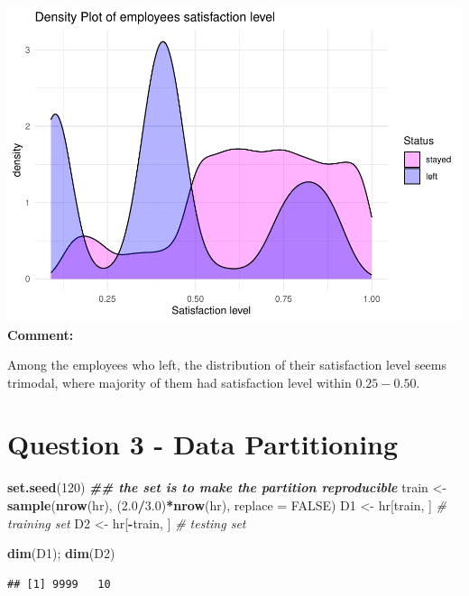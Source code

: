 \documentclass[
  11pt,
]{article}
\newenvironment{Shaded}{\begin{snugshade}}{\end{snugshade}}
\newcommand{\AttributeTok}[1]{\textcolor[rgb]{0.13,0.29,0.53}{#1}}
\newcommand{\CommentTok}[1]{\textcolor[rgb]{0.56,0.35,0.01}{\textit{#1}}}
\newcommand{\ConstantTok}[1]{\textcolor[rgb]{0.56,0.35,0.01}{#1}}
\newcommand{\DecValTok}[1]{\textcolor[rgb]{0.00,0.00,0.81}{#1}}
\newcommand{\DocumentationTok}[1]{\textcolor[rgb]{0.56,0.35,0.01}{\textbf{\textit{#1}}}}
\newcommand{\FloatTok}[1]{\textcolor[rgb]{0.00,0.00,0.81}{#1}}
\newcommand{\FunctionTok}[1]{\textcolor[rgb]{0.13,0.29,0.53}{\textbf{#1}}}
\newcommand{\NormalTok}[1]{#1}
\newcommand{\OtherTok}[1]{\textcolor[rgb]{0.56,0.35,0.01}{#1}}
\newcommand{\SpecialCharTok}[1]{\textcolor[rgb]{0.81,0.36,0.00}{\textbf{#1}}}
\begin{document}
\includegraphics[width=0.9\linewidth]{OWUSU_project_files/figure-latex/unnamed-chunk-16-1}\\

\textbf{Comment:}

Among the employees who left, the distribution of their satisfaction
level seems trimodal, where majority of them had satisfaction level
within \(0.25 - 0.50\).

\newpage
\section{Question 3 - Data Partitioning }

\begin{Shaded}
\begin{Highlighting}[]
\FunctionTok{set.seed}\NormalTok{(}\DecValTok{120}\NormalTok{) }\DocumentationTok{\#\# the set is to make the partition reproducible}
\NormalTok{train }\OtherTok{\textless{}{-}} \FunctionTok{sample}\NormalTok{(}\FunctionTok{nrow}\NormalTok{(hr), (}\FloatTok{2.0}\SpecialCharTok{/}\FloatTok{3.0}\NormalTok{)}\SpecialCharTok{*}\FunctionTok{nrow}\NormalTok{(hr), }\AttributeTok{replace =} \ConstantTok{FALSE}\NormalTok{) }
\NormalTok{D1 }\OtherTok{\textless{}{-}}\NormalTok{ hr[train, ] }\CommentTok{\# training set}
\NormalTok{D2 }\OtherTok{\textless{}{-}}\NormalTok{ hr[}\SpecialCharTok{{-}}\NormalTok{train, ] }\CommentTok{\# testing set}

\FunctionTok{dim}\NormalTok{(D1); }\FunctionTok{dim}\NormalTok{(D2)}
\end{Highlighting}
\end{Shaded}

\begin{verbatim}
## [1] 9999   10
\end{verbatim}
\end{document}

